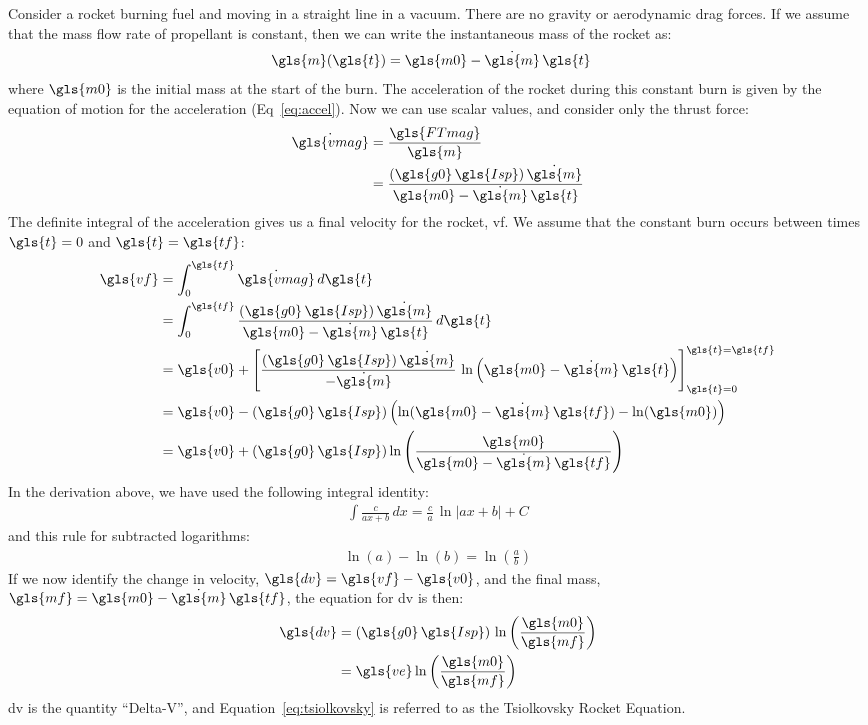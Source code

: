 \documentclass[12pt,openany]{book}
\begin{document}
Consider a rocket burning fuel and moving in a straight line in a vacuum. There are no gravity or aerodynamic drag forces. If we assume that the mass flow rate of propellant is constant, then we can write the instantaneous mass of the rocket as:
\begin{align}
  \gls{m}(\gls{t}) &= \gls{m0} - \dot{\gls{m}}\,\gls{t}
\end{align}
where $\gls{m0}$ is the initial mass at the start of the burn. The acceleration of the rocket during this constant burn is given by the equation of motion for the acceleration (Eq~\ref{eq:accel}). Now we can use scalar values, and consider only the thrust force:
\begin{align}
  \dot{\gls{vmag}} &= \frac{\gls{FTmag}}{\gls{m}} \\
  &= \frac{(\gls{g0}\,\gls{Isp})\,\dot{\gls{m}}}{\gls{m0} - \dot{\gls{m}}\,\gls{t}}
\end{align}
The definite integral of the acceleration gives us a final velocity for the rocket, \gls{vf}. We assume that the constant burn occurs between times $\gls{t}=0$ and $\gls{t}=\gls{tf}$:
\begin{align}
  \gls{vf} &= \int_0^{\gls{tf}} \dot{\gls{vmag}}\,d\gls{t} \\
  &= \int_0^{\gls{tf}} \frac{(\gls{g0}\,\gls{Isp})\,\dot{\gls{m}}}{\gls{m0} - \dot{\gls{m}}\,\gls{t}}\,d\gls{t} \\
  &= \gls{v0} + \left[\frac{(\gls{g0}\,\gls{Isp})\,\dot{\gls{m}}}{-\dot{\gls{m}}}\,\ln\left(\gls{m0}-\dot{\gls{m}}\,\gls{t}\right)\right]_{\gls{t}=0}^{\gls{t}=\gls{tf}} \\
  &= \gls{v0} - (\gls{g0}\,\gls{Isp})\left(\ln(\gls{m0}-\dot{\gls{m}}\,\gls{tf})-\ln(\gls{m0})\right) \\
  &= \gls{v0} + (\gls{g0}\,\gls{Isp})\ln\left(\frac{\gls{m0}}{\gls{m0}-\dot{\gls{m}}\,\gls{tf}}\right)
\end{align}
In the derivation above, we have used the following integral identity:
\begin{align}
  \int \frac{c}{ax+b}\,dx = \frac{c}{a}\,\ln\left|ax+b\right| + C
\end{align} 
and this rule for subtracted logarithms:
\begin{align}
  \ln(a) - \ln(b) = \ln\left(\frac{a}{b}\right)
\end{align}
If we now identify the change in velocity, $\gls{dv}=\gls{vf}-\gls{v0}$, and the final mass, $\gls{mf}=\gls{m0}-\dot{\gls{m}}\,\gls{tf}$, the equation for \gls{dv} is then:
\begin{align}
  \gls{dv} &= (\gls{g0}\,\gls{Isp})\,\ln\left(\frac{\gls{m0}}{\gls{mf}}\right) \\
  &= \gls{ve}\ln\left(\frac{\gls{m0}}{\gls{mf}}\right) \label{eq:tsiolkovsky}
\end{align}
\gls{dv} is the quantity ``Delta-V'', and Equation~\ref{eq:tsiolkovsky} is referred to as the Tsiolkovsky Rocket Equation.

\printunsrtglossary[type=symbols,style=long]



\end{document}
